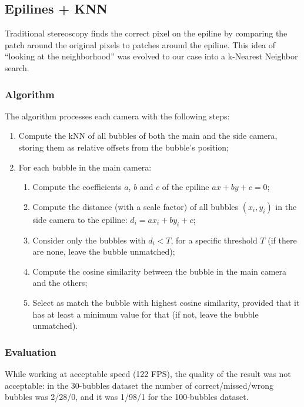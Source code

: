 \subsection{Epilines + KNN}
\label{sec:match:epi-knn}

Traditional stereoscopy finds the correct pixel on the epiline by comparing the patch around the original pixels to patches around the epiline.
This idea of ``looking at the neighborhood'' was evolved to our case into a k-Nearest Neighbor search.

\subsubsection{Algorithm}

The algorithm processes each camera with the following steps:
\begin{enumerate}
	\itemsep 0em
	\item Compute the kNN of all bubbles of both the main and the side camera, storing them as relative offsets from the bubble's position;
	\item For each bubble in the main camera:
	      \begin{enumerate}
		      \item Compute the coefficients $a$, $b$ and $c$ of the epiline $ax+by+c{=}0$;
		      \item Compute the distance (with a scale factor) of all bubbles $(x_i, y_i)$ in the side camera to the epiline: $d_i = ax_i + by_i + c$;
		      \item Consider only the bubbles with $d_i<T$, for a specific threshold $T$ (if there are none, leave the bubble unmatched);
		      \item Compute the cosine similarity between the bubble in the main camera and the others;
		      \item Select as match the bubble with highest cosine similarity, provided that it has at least a minimum value for that (if not, leave the bubble unmatched).
	      \end{enumerate}
\end{enumerate}

\subsubsection{Evaluation}

While working at acceptable speed (122 FPS), the quality of the result was not acceptable: in the 30-bubbles dataset the number of correct/missed/wrong bubbles was 2/28/0, and it was 1/98/1 for the 100-bubbles dataset.
